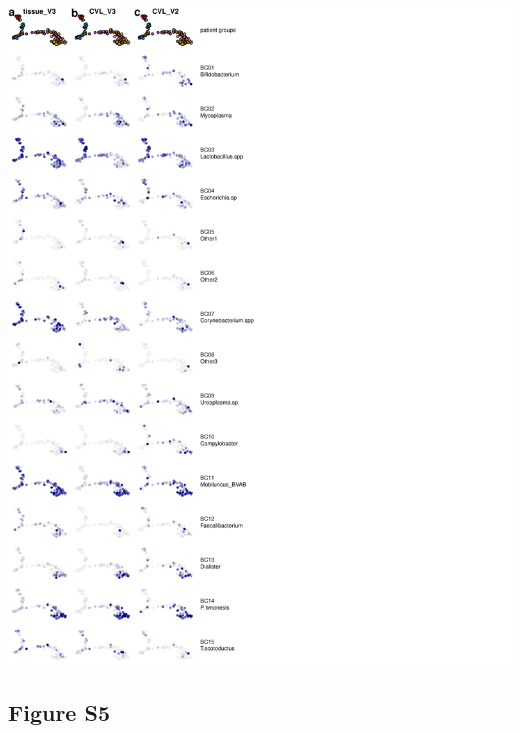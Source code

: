 \documentclass[
]{article}
\begin{document}
\includegraphics[width=1\linewidth]{manuscript_template_files/figure-latex/unnamed-chunk-14-1}

\clearpage

\hypertarget{figure-s5}{%
\subsection{Figure S5}\label{figure-s5}}
\end{document}
